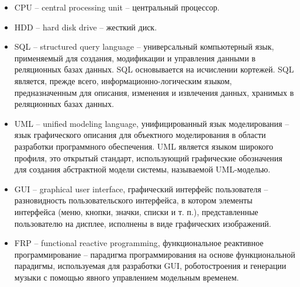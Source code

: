 \begin{itemize}
\item CPU -- central processing unit -- центральный процессор.
\item HDD -- hard disk drive -- жесткий диск.
\item SQL -- structured query language -- универсальный компьютерный язык, применяемый для создания, модификации и управления данными в реляционных базах данных. SQL основывается на исчислении кортежей. SQL является, прежде всего, информационно-логическим языком, предназначенным для описания, изменения и извлечения данных, хранимых в реляционных базах данных. 
\item UML -- unified modeling language, унифицированный язык моделирования -- язык графического описания для объектного моделирования в области разработки программного обеспечения. UML является языком широкого профиля, это открытый стандарт, использующий графические обозначения для создания абстрактной модели системы, называемой UML-моделью.
\item GUI -- graphical user interface, графический интерфейс пользователя -- разновидность пользовательского интерфейса, в котором элементы интерфейса (меню, кнопки, значки, списки и т. п.), представленные пользователю на дисплее, исполнены в виде графических изображений.
\item FRP -- functional reactive programming, функциональное реактивное программирование -- парадигма программирования на основе функциональной парадигмы, используемая для разработки GUI, роботостроения и генерации музыки с помощью явного управлением модельным временем.
\end{itemize}
